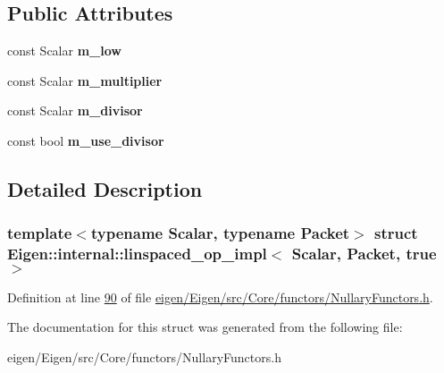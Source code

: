 \subsection*{Public Attributes}
\begin{DoxyCompactItemize}
\item 
\mbox{\label{struct_eigen_1_1internal_1_1linspaced__op__impl_3_01_scalar_00_01_packet_00_01true_01_4_a9eab1c684bcca5fff3f7841bacb189fb}} 
const Scalar {\bfseries m\+\_\+low}
\item 
\mbox{\label{struct_eigen_1_1internal_1_1linspaced__op__impl_3_01_scalar_00_01_packet_00_01true_01_4_afc3c2022438d153d96af7368bc8375c2}} 
const Scalar {\bfseries m\+\_\+multiplier}
\item 
\mbox{\label{struct_eigen_1_1internal_1_1linspaced__op__impl_3_01_scalar_00_01_packet_00_01true_01_4_ad07beb5652b1103949dd1c1b29666b94}} 
const Scalar {\bfseries m\+\_\+divisor}
\item 
\mbox{\label{struct_eigen_1_1internal_1_1linspaced__op__impl_3_01_scalar_00_01_packet_00_01true_01_4_aa4358c062dc96ee6b0af20d6cce7f279}} 
const bool {\bfseries m\+\_\+use\+\_\+divisor}
\end{DoxyCompactItemize}


\subsection{Detailed Description}
\subsubsection*{template$<$typename Scalar, typename Packet$>$\newline
struct Eigen\+::internal\+::linspaced\+\_\+op\+\_\+impl$<$ Scalar, Packet, true $>$}



Definition at line \hyperlink{eigen_2_eigen_2src_2_core_2functors_2_nullary_functors_8h_source_l00090}{90} of file \hyperlink{eigen_2_eigen_2src_2_core_2functors_2_nullary_functors_8h_source}{eigen/\+Eigen/src/\+Core/functors/\+Nullary\+Functors.\+h}.



The documentation for this struct was generated from the following file\+:\begin{DoxyCompactItemize}
\item 
eigen/\+Eigen/src/\+Core/functors/\+Nullary\+Functors.\+h\end{DoxyCompactItemize}

